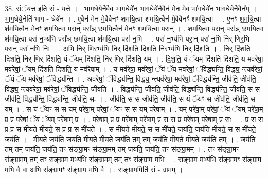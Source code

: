 \documentclass[17pt]{extarticle}
\begin{document}
38. संॅय॑त्त॒ इति॒ सं - य॒त्ते॒ । . भा॒ग॒धेये॑नै॒वैव भा॑ग॒धेये॑न भाग॒धेये॑नै॒वैन॑ मेन मे॒व भा॑ग॒धेये॑न भाग॒धेये॑नै॒वैन᳚म् । . भा॒ग॒धेये॒नेति॑ भाग - धेये॑न । . ए॒वैन॑ मेन मे॒वैवैनꣳ॑ शमयि॒त्वा श॑मयि॒त्वैन॑ मे॒वैवैनꣳ॑ शमयि॒त्वा । . ए॒नꣳ॒॒ श॒म॒यि॒त्वा श॑मयि॒त्वैन॑ मेनꣳ शमयि॒त्वा परा॒न् परा᳚ञ् छमयि॒त्वैन॑ मेनꣳ शमयि॒त्वा परान्॑ । . श॒म॒यि॒त्वा परा॒न् परा᳚ञ् छमयि॒त्वा श॑मयि॒त्वा परा॑ न॒भ्य॑भि परा᳚ञ् छमयि॒त्वा श॑मयि॒त्वा परा॑ न॒भि । . परा॑ न॒भ्य॑भि परा॒न् परा॑ न॒भि निर् णिर॒भि परा॒न् परा॑ न॒भि निः । . अ॒भि निर् णिर॒भ्य॑भि निर् दि॑शति दिशति॒ निर॒भ्य॑भि निर् दि॑शति । . निर् दि॑शति दिशति॒ निर् णिर् दि॑शति॒ यं ॅयम् दि॑शति॒ निर् णिर् दि॑शति॒ यम् । . दि॒श॒ति॒ यं ॅयम् दि॑शति दिशति॒ य मव॑रेषा॒ मव॑रेषां॒ ॅयम् दि॑शति दिशति॒ य मव॑रेषाम् । . य मव॑रेषा॒ मव॑रेषां॒ ॅयं ॅय मव॑रेषां॒ ॅविद्ध्य॑न्ति॒ विद्ध्य॒ न्त्यव॑रेषां॒ ॅयं ॅय मव॑रेषां॒ ॅविद्ध्य॑न्ति । . अव॑रेषां॒ ॅविद्ध्य॑न्ति॒ विद्ध्य॒ न्त्यव॑रेषा॒ मव॑रेषां॒ ॅविद्ध्य॑न्ति॒ जीव॑ति॒ जीव॑ति॒ विद्ध्य॒ न्त्यव॑रेषा॒ मव॑रेषां॒ ॅविद्ध्य॑न्ति॒ जीव॑ति । . विद्ध्य॑न्ति॒ जीव॑ति॒ जीव॑ति॒ विद्ध्य॑न्ति॒ विद्ध्य॑न्ति॒ जीव॑ति॒ स स जीव॑ति॒ विद्ध्य॑न्ति॒ विद्ध्य॑न्ति॒ जीव॑ति॒ सः । . जीव॑ति॒ स स जीव॑ति॒ जीव॑ति॒ स यं ॅयꣳ स जीव॑ति॒ जीव॑ति॒ स यम् । . स यं ॅयꣳ स स यम् परे॑षा॒म् परे॑षां॒ ॅयꣳ स स यम् परे॑षाम् । . यम् परे॑षा॒म् परे॑षां॒ ॅयं ॅयम् परे॑षा॒म् प्र प्र परे॑षां॒ ॅयं ॅयम् परे॑षा॒म् प्र । . परे॑षा॒म् प्र प्र परे॑षा॒म् परे॑षा॒म् प्र स स प्र परे॑षा॒म् परे॑षा॒म् प्र सः । . प्र स स प्र प्र स मी॑यते मीयते॒ स प्र प्र स मी॑यते । . स मी॑यते मीयते॒ स स मी॑यते॒ जय॑ति॒ जय॑ति मीयते॒ स स मी॑यते॒ जय॑ति । . मी॒य॒ते॒ जय॑ति॒ जय॑ति मीयते मीयते॒ जय॑ति॒ तम् तम् जय॑ति मीयते मीयते॒ जय॑ति॒ तम् । . जय॑ति॒ तम् तम् जय॑ति॒ जय॑ति॒ तꣳ स॑ङ्ग्रा॒मꣳ स॑ङ्ग्रा॒मम् तम् जय॑ति॒ जय॑ति॒ तꣳ स॑ङ्ग्रा॒मम् । . तꣳ स॑ङ्ग्रा॒मꣳ स॑ङ्ग्रा॒मम् तम् तꣳ स॑ङ्ग्रा॒म म॒भ्य॑भि स॑ङ्ग्रा॒मम् तम् तꣳ स॑ङ्ग्रा॒म म॒भि । . स॒ङ्ग्रा॒म म॒भ्य॑भि स॑ङ्ग्रा॒मꣳ स॑ङ्ग्रा॒म म॒भि वै वा अ॒भि स॑ङ्ग्रा॒मꣳ स॑ङ्ग्रा॒म म॒भि वै । . स॒ङ्ग्रा॒ममिति॑ सं - ग्रा॒मम् । \newline
\pagebreak
{}
\end{document}
